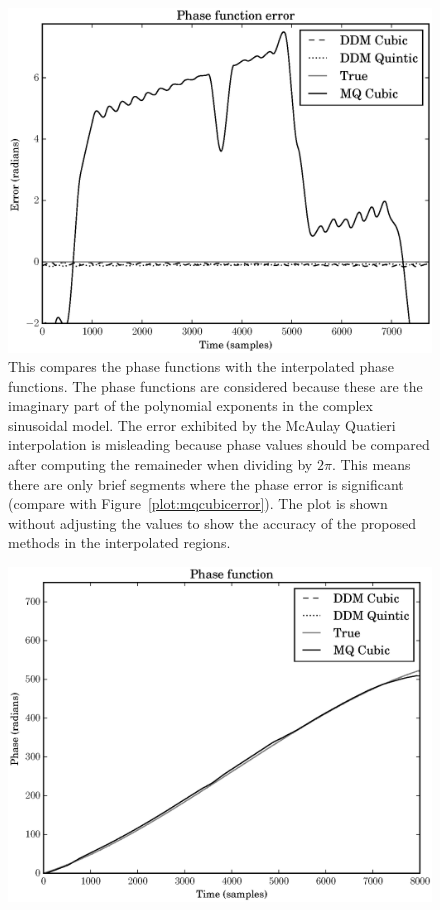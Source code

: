 \documentclass[letterpaper,12pt]{report}
\begin{document}
\begin{figure}
    \includegraphics[width=\textwidth]{plots/mq_mod_err_comp_phase_err.eps}
    \caption{This compares the phase functions with the interpolated phase
    functions. The phase functions are considered because these are the
    imaginary part of the polynomial exponents in the complex sinusoidal model.
    The error exhibited by the McAulay \textendash Quatieri interpolation is
    misleading because phase values should be compared after computing the
    remaineder when dividing by $2\pi$. This means there are only brief segments
    where the phase error is significant (compare with
    Figure~\ref{plot:mqcubicerror}). The plot is shown without adjusting the
    values to show the accuracy of the proposed methods in the interpolated
    regions.
    \label{plot:mqmoderrcompphaseerr}}
\end{figure}

\begin{figure}
    \includegraphics[width=\textwidth]{plots/mq_mod_err_comp_phase_func.eps}
    \caption{\label{plot:mqmoderrcompphasefunc}}
\end{figure}
\end{document}
